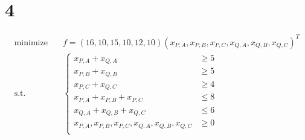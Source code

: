 \documentclass[a4paper,12pt]{article}
\begin{document}
\section*{4}
\begin{align*}
    \text{minimize} & \quad f = (16, 10, 15, 10, 12, 10) (x_{P, A}, x_{P, B}, x_{P, C}, x_{Q, A}, x_{Q, B}, x_{Q, C})^T \\
    \text{s.t.}     & \quad
    \begin{cases}
        x_{P,A} + x_{Q,A}                                    & \geq 5 \\
        x_{P,B} + x_{Q,B}                                    & \geq 5 \\
        x_{P,C} + x_{Q,C}                                    & \geq 4 \\
        x_{P,A} + x_{P,B} + x_{P,C}                          & \leq 8 \\
        x_{Q,A} + x_{Q,B} + x_{Q,C}                          & \leq 6 \\
        x_{P,A}, x_{P,B}, x_{P,C}, x_{Q,A}, x_{Q,B}, x_{Q,C} & \geq 0 \\
    \end{cases}
\end{align*}
\end{document}
